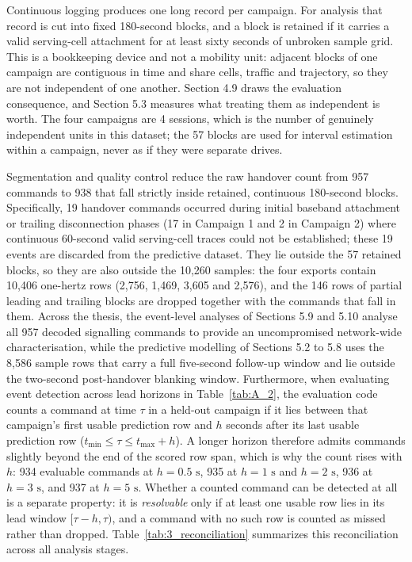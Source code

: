 Continuous logging produces one long record per campaign. For analysis that record is cut into fixed 180-second blocks, and a block is retained if it carries a valid serving-cell attachment for at least sixty seconds of unbroken sample grid. This is a bookkeeping device and not a mobility unit: adjacent blocks of one campaign are contiguous in time and share cells, traffic and trajectory, so they are not independent of one another. Section 4.9 draws the evaluation consequence, and Section 5.3 measures what treating them as independent is worth. The four campaigns are 4 sessions, which is the number of genuinely independent units in this dataset; the 57 blocks are used for interval estimation within a campaign, never as if they were separate drives.

Segmentation and quality control reduce the raw handover count from 957 commands to 938 that fall strictly inside retained, continuous 180-second blocks. Specifically, 19 handover commands occurred during initial baseband attachment or trailing disconnection phases (17 in Campaign 1 and 2 in Campaign 2) where continuous 60-second valid serving-cell traces could not be established; these 19 events are discarded from the predictive dataset. They lie outside the 57 retained blocks, so they are also outside the 10,260 samples: the four exports contain 10,406 one-hertz rows (2,756, 1,469, 3,605 and 2,576), and the 146 rows of partial leading and trailing blocks are dropped together with the commands that fall in them. Across the thesis, the event-level analyses of Sections 5.9 and 5.10 analyse all 957 decoded signalling commands to provide an uncompromised network-wide characterisation, while the predictive modelling of Sections 5.2 to 5.8 uses the 8,586 sample rows that carry a full five-second follow-up window and lie outside the two-second post-handover blanking window. Furthermore, when evaluating event detection across lead horizons in Table~\ref{tab:A_2}, the evaluation code counts a command at time $\tau$ in a held-out campaign if it lies between that campaign's first usable prediction row and $h$ seconds after its last usable prediction row ($t_{\min} \le \tau \le t_{\max} + h$). A longer horizon therefore admits commands slightly beyond the end of the scored row span, which is why the count rises with $h$: 934 evaluable commands at $h = 0.5\text{ s}$, 935 at $h = 1\text{ s}$ and $h = 2\text{ s}$, 936 at $h = 3\text{ s}$, and 937 at $h = 5\text{ s}$. Whether a counted command can be detected at all is a separate property: it is \emph{resolvable} only if at least one usable row lies in its lead window $[\tau - h, \tau)$, and a command with no such row is counted as missed rather than dropped. Table~\ref{tab:3_reconciliation} summarizes this reconciliation across all analysis stages.


